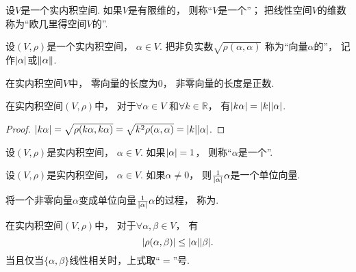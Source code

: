 \begin{definition}
设\(V\)是一个实内积空间.
如果\(V\)是有限维的，
则称“\(V\)是一个”；
把线性空间\(V\)的维数称为“欧几里得空间\(V\)的”.
\end{definition}

\begin{definition}
设\((V,\rho)\)是一个实内积空间，
\(\alpha \in V\).
把非负实数\(\sqrt{\rho(\alpha,\alpha)}\)
称为“向量\(\alpha\)的”，
记作\(\abs{\alpha}\)或\(\norm{\alpha}\).
\end{definition}

\begin{property}
在实内积空间\(V\)中，
零向量的长度为\(0\)，
非零向量的长度是正数.
\end{property}

\begin{property}
在实内积空间\((V,\rho)\)中，
对于\(\forall \alpha \in V\)
和\(\forall k \in \mathbb{R}\)，
有\(\abs{k\alpha} = \abs{k} \abs{\alpha}\).
\begin{proof}
\(\abs{k\alpha}
= \sqrt{\rho(k\alpha,k\alpha)}
= \sqrt{k^2\rho(\alpha,\alpha)}
= \abs{k} \abs{\alpha}\).
\end{proof}
\end{property}

\begin{definition}
设\((V,\rho)\)是实内积空间，
\(\alpha \in V\).
如果\(\abs{\alpha} = 1\)，
则称“\(\alpha\)是一个”.
\end{definition}

\begin{property}
设\((V,\rho)\)是实内积空间，
\(\alpha \in V\).
如果\(\alpha\neq0\)，
则\(\frac1{\abs{\alpha}} \alpha\)是一个单位向量.
\end{property}
\begin{remark}
将一个非零向量\(\alpha\)变成单位向量\(\frac1{\abs{\alpha}} \alpha\)的过程，
称为.
\end{remark}

\begin{theorem}
在实内积空间\((V,\rho)\)中，
对于\(\forall \alpha,\beta \in V\)，
有\begin{equation}
	\abs{\rho(\alpha,\beta)} \leq \abs{\alpha} \abs{\beta}.
\end{equation}
当且仅当\(\{\alpha,\beta\}\)线性相关时，上式取“\(=\)”号.
\end{theorem}


